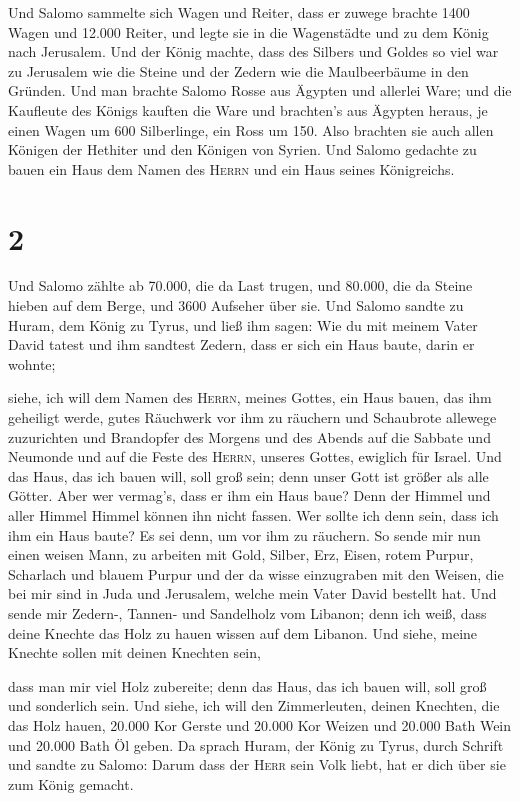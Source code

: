  Und Salomo sammelte sich Wagen und Reiter, dass er
zuwege brachte 1400 Wagen und 12.000 Reiter, und legte sie in die
Wagenstädte und zu dem König nach Jerusalem.  Und der
König machte, dass des Silbers und Goldes so viel war zu Jerusalem wie
die Steine und der Zedern wie die Maulbeerbäume in den Gründen.
 Und man brachte Salomo Rosse aus Ägypten und allerlei
Ware; und die Kaufleute des Königs kauften die Ware  und
brachten's aus Ägypten heraus, je einen Wagen um 600 Silberlinge, ein
Ross um 150. Also brachten sie auch allen Königen der Hethiter und den
Königen von Syrien.  Und Salomo gedachte zu bauen ein
Haus dem Namen des \textsc{Herrn} und ein Haus seines Königreichs.

\hypertarget{section-1}{%
\section{2}\label{section-1}}

 Und Salomo zählte ab 70.000, die da Last trugen, und
80.000, die da Steine hieben auf dem Berge, und 3600 Aufseher über sie.
 Und Salomo sandte zu Huram, dem König zu Tyrus, und ließ
ihm sagen: Wie du mit meinem Vater David tatest und ihm sandtest Zedern,
dass er sich ein Haus baute, darin er wohnte;

 siehe, ich will dem Namen des \textsc{Herrn}, meines
Gottes, ein Haus bauen, das ihm geheiligt werde, gutes Räuchwerk vor ihm
zu räuchern und Schaubrote allewege zuzurichten und Brandopfer des
Morgens und des Abends auf die Sabbate und Neumonde und auf die Feste
des \textsc{Herrn}, unseres Gottes, ewiglich für Israel. 
Und das Haus, das ich bauen will, soll groß sein; denn unser Gott ist
größer als alle Götter.  Aber wer vermag's, dass er ihm
ein Haus baue? Denn der Himmel und aller Himmel Himmel können ihn nicht
fassen. Wer sollte ich denn sein, dass ich ihm ein Haus baute? Es sei
denn, um vor ihm zu räuchern.  So sende mir nun einen
weisen Mann, zu arbeiten mit Gold, Silber, Erz, Eisen, rotem Purpur,
Scharlach und blauem Purpur und der da wisse einzugraben mit den Weisen,
die bei mir sind in Juda und Jerusalem, welche mein Vater David bestellt
hat.  Und sende mir Zedern-, Tannen- und Sandelholz vom
Libanon; denn ich weiß, dass deine Knechte das Holz zu hauen wissen auf
dem Libanon. Und siehe, meine Knechte sollen mit deinen Knechten sein,

 dass man mir viel Holz zubereite; denn das Haus, das ich
bauen will, soll groß und sonderlich sein.  Und siehe, ich
will den Zimmerleuten, deinen Knechten, die das Holz hauen, 20.000 Kor
Gerste und 20.000 Kor Weizen und 20.000 Bath Wein und 20.000 Bath Öl
geben.  Da sprach Huram, der König zu Tyrus, durch
Schrift und sandte zu Salomo: Darum dass der \textsc{Herr} sein Volk
liebt, hat er dich über sie zum König gemacht.

